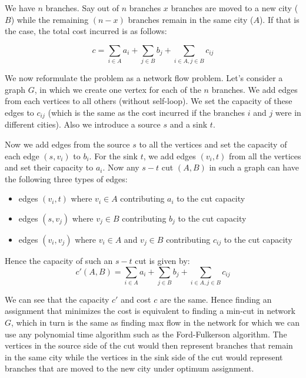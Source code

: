 We have $n$ branches. Say out of $n$ branches $x$ branches are moved to a new city ($B$) while the remaining $(n - x)$ branches remain in the same city ($A$). If that is the case, the total cost incurred is as follows:

\[
  c = \sum\limits_{i \in A} a_i + \sum\limits_{j \in B} b_j + \sum\limits_{i \in A, j \in B} c_{ij}
\]

We now reformulate the problem as a network flow problem. Let's consider a graph $G$, in which we create one vertex for each of the  $n$ branches. We add edges from each vertices to all others (without self-loop). We set the capacity of these edges to $c_{ij}$ (which is the same as the cost incurred if the branches $i$ and $j$ were in different cities). Also we introduce a source $s$ and a sink $t$.

Now we add edges from the source $s$ to all the vertices and set the capacity of each edge $(s, v_i)$ to $b_i$. For the sink $t$, we add edges $(v_i, t)$ from all the vertices and set their capacity to $a_i$. Now any $s-t$ cut $(A, B)$ in such a graph can have the following three types of edges:

\begin{itemize}
\item edges $(v_i, t)$ where $v_i \in A$ contributing $a_i$ to the cut capacity
\item edges $(s, v_j)$ where $v_j \in B$ contributing $b_j$ to the cut capacity
\item edges $(v_i, v_j)$ where $v_i \in A$ and $v_j \in B$ contributing $c_{ij}$ to the cut capacity
\end{itemize}

Hence the capacity of such an $s-t$ cut is given by:\\

\[
  c'(A, B) = \sum\limits_{i \in A} a_i + \sum\limits_{j \in B} b_j + \sum\limits_{i \in A, j \in B} c_{ij}
\]




We can see that the capacity $c'$ and cost $c$ are the same. Hence finding an assignment that minimizes the cost is equivalent to finding a min-cut in network $G$, which in turn is the same as finding max flow in the network for which we can use any polynomial time algorithm such as the Ford-Fulkerson algorithm. The vertices in the source side of the cut would then represent branches that remain in the same city while the vertices in the sink side of the cut would represent branches that are moved to the new city under optimum assignment.

